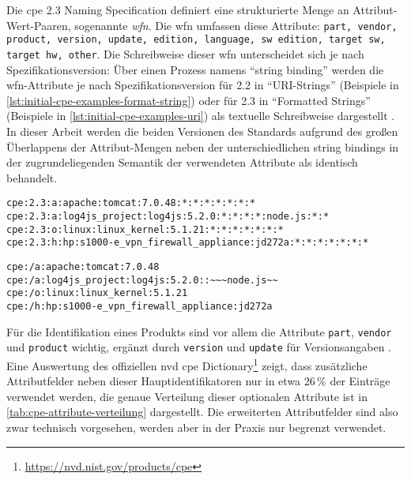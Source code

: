 Die \acrshort{cpe} 2.3 Naming Specification definiert eine strukturierte Menge an Attribut-Wert-Paaren, sogenannte \textit{\acrfull{wfn}}.
Die \acrshort{wfn} umfassen diese Attribute: \texttt{part, vendor, product, version, update, edition, language, sw edition, target sw, target hw, other}.
Die Schreibweise dieser \acrshort{wfn} unterscheidet sich je nach Spezifikationsversion:
Über einen Prozess namens \enquote{string binding} werden die \acrshort{wfn}-Attribute je nach Spezifikationsversion für 2.2 in \enquote{URI-Strings} (Beispiele in \autoref{lst:initial-cpe-examples-format-string}) oder für 2.3 in \enquote{Formatted Strings} (Beispiele in \autoref{lst:initial-cpe-examples-uri}) als textuelle Schreibweise dargestellt \autocite{Cheikes_Waltermire_Scarfone_2011}.
In dieser Arbeit werden die beiden Versionen des Standards aufgrund des großen Überlappens der Attribut-Mengen neben der unterschiedlichen string bindings in der zugrundeliegenden Semantik der verwendeten Attribute als identisch behandelt.

\begin{lstlisting}[caption=Beispielhafte WFN als CPE 2.3 Format Strings,label=lst:initial-cpe-examples-format-string]
cpe:2.3:a:apache:tomcat:7.0.48:*:*:*:*:*:*:*
cpe:2.3:a:log4js_project:log4js:5.2.0:*:*:*:*:node.js:*:*
cpe:2.3:o:linux:linux_kernel:5.1.21:*:*:*:*:*:*:*
cpe:2.3:h:hp:s1000-e_vpn_firewall_appliance:jd272a:*:*:*:*:*:*:*
\end{lstlisting}

\begin{lstlisting}[caption=Beispielhafte WFN als CPE 2.2 URI,label=lst:initial-cpe-examples-uri]
cpe:/a:apache:tomcat:7.0.48
cpe:/a:log4js_project:log4js:5.2.0::~~~node.js~~
cpe:/o:linux:linux_kernel:5.1.21
cpe:/h:hp:s1000-e_vpn_firewall_appliance:jd272a
\end{lstlisting}

Für die Identifikation eines Produkts sind vor allem die Attribute \texttt{part}, \texttt{vendor} und \texttt{product} wichtig, ergänzt durch \texttt{version} und \texttt{update} für Versionsangaben \autocite{Cheikes_Waltermire_Scarfone_2011}.
Eine Auswertung des offiziellen \acrshort{nvd} \acrshort{cpe} Dictionary\footnote{\url{https://nvd.nist.gov/products/cpe}} zeigt, dass zusätzliche Attributfelder neben dieser Hauptidentifikatoren nur in etwa 26\,\% der Einträge verwendet werden, die genaue Verteilung dieser optionalen Attribute ist in \autoref{tab:cpe-attribute-verteilung} dargestellt.
Die erweiterten Attributfelder sind also zwar technisch vorgesehen, werden aber in der Praxis nur begrenzt verwendet.

